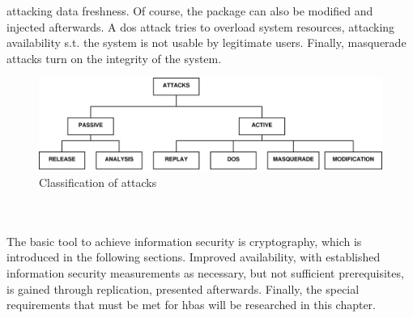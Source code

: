 attacking data freshness. Of course,
the package can also be modified and injected afterwards.
A \gls{dos} attack tries to overload system resources, attacking availability s.t. the system is not
usable by legitimate users. Finally, masquerade attacks turn on the integrity of the system.
\begin{figure}
    \centering
    \includegraphics[width=1\textwidth]{figures/attacks.eps}
    \caption{Classification of attacks}
    \label{fig:attacks}
\end{figure}
\\
\\
The basic tool to achieve information security is cryptography, which is introduced in the following sections. Improved availability, with established 
information security measurements as necessary, but not sufficient prerequisites, is gained through replication, presented afterwards.
Finally, the special requirements that must be met for \gls{hbas} will be researched in this chapter.

